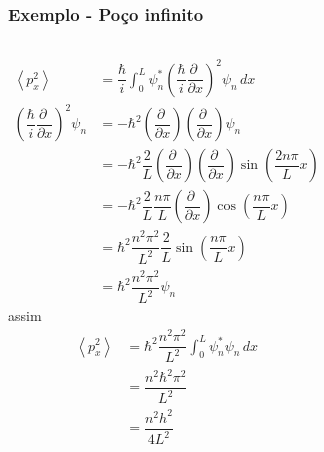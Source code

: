\documentclass[12pt,brazil]{beamer}
\begin{document}

\begin{frame}
  \frametitle{Exemplo - Poço infinito}  
  \fontsize{8.5pt}{11pt}\selectfont
  
  \begin{columns}[c]

  \column{5cm}
    \begin{align*}
            \left< p_x^2 \right>& = \dfrac{\hbar}{i}\int_0^L \psi_n^* \left( \dfrac{\hbar}{i}\dfrac{\partial\;}{\partial x} \right)^2 \psi_n\,dx\\
            \left( \dfrac{\hbar}{i} \dfrac{\partial\;}{\partial x} \right)^2 \psi_n &= -\hbar^2\left( \dfrac{\partial\;}{\partial x} \right) \left( \dfrac{\partial\;}{\partial x} \right)\psi_n\\
            &= -\hbar^2\dfrac{2}{L}\left( \dfrac{\partial\;}{\partial x} \right) \left( \dfrac{\partial\;}{\partial x} \right)\sin\left( \dfrac{2n\pi}{L}x \right)\\
            &= -\hbar^2\dfrac{2}{L}\dfrac{n\pi}{L}\left( \dfrac{\partial\;}{\partial x} \right)\cos \left( \dfrac{n\pi}{L}x \right)\\
            &= \hbar^2\dfrac{n^2\pi^2}{L^2}\dfrac{2}{L}\sin \left( \dfrac{n\pi}{L}x \right)\\
            &= \hbar^2\dfrac{n^2\pi^2}{L^2}\psi_n
          \end{align*}
  \column{5cm}
          assim
          \begin{align*}
            \left< p_x^2 \right>& = \hbar^2\dfrac{n^2\pi^2}{L^2}\int_0^L \psi_n^*\psi_n\,dx\\
            & = \dfrac{n^2\hbar^2\pi^2}{L^2}\\
            & = \dfrac{n^2h^2}{4L^2}
          \end{align*}
  \end{columns}
\end{frame}

\end{document}
